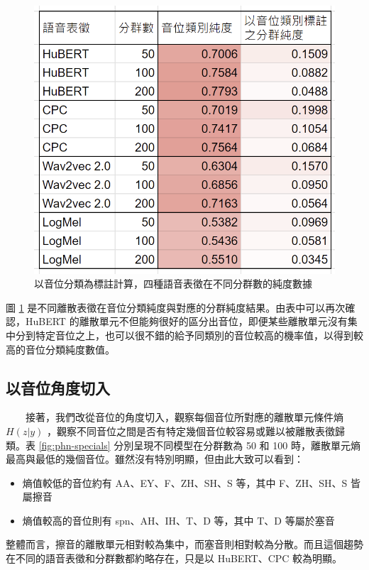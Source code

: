 \begin{figure}
        \centering
        \includegraphics[width=0.55\linewidth]{figures/pcls-pur.png}
    \caption{以音位分類為標註計算，四種語音表徵在不同分群數的純度數據}
    \label{fig:pcls}
    \end{figure}

圖 \ref{fig:pcls} 是不同離散表徵在音位分類純度與對應的分群純度結果。由表中可以再次確認，HuBERT 的離散單元不但能夠很好的區分出音位，即便某些離散單元沒有集中分到特定音位之上，也可以很不錯的給予同類別的音位較高的機率值，以得到較高的音位分類純度數值。



\subsection{以音位角度切入}

　　接著，我們改從音位的角度切入，觀察每個音位所對應的離散單元條件熵 $H(z|y)$ ，觀察不同音位之間是否有特定幾個音位較容易或難以被離散表徵歸類。表 \ref{fig:phn-specials} 分別呈現不同模型在分群數為 50 和 100 時，離散單元熵最高與最低的幾個音位。雖然沒有特別明顯，但由此大致可以看到：

\begin{itemize}
    \item 熵值較低的音位約有 AA、EY、F、ZH、SH、S 等，其中 F、ZH、SH、S 皆屬擦音
    \item 熵值較高的音位則有 spn、AH、IH、T、D 等，其中 T、D 等屬於塞音  %
\end{itemize}

整體而言，擦音的離散單元相對較為集中，而塞音則相對較為分散。而且這個趨勢在不同的語音表徵和分群數都約略存在，只是以 HuBERT、CPC 較為明顯。


